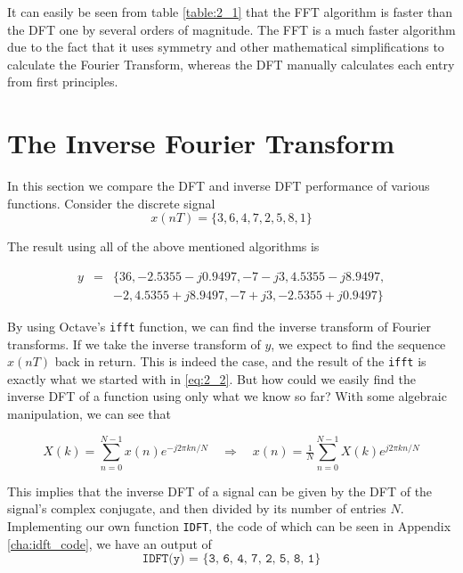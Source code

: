 \documentclass[a4paper, 12pt]{report}
\begin{document}
			It can easily be seen from table \ref{table:2_1} that the FFT algorithm is faster than the DFT one by several orders of magnitude. The FFT is a much faster algorithm due to the fact that it uses symmetry and other mathematical simplifications to calculate the Fourier Transform, whereas the DFT manually calculates each entry from first principles.

		\section{The Inverse Fourier Transform} %
		\label{sec:section_name}
			In this section we compare the DFT and inverse DFT performance of various functions. Consider the discrete signal
			\begin{equation}
				x(nT) = \{3, 6, 4, 7, 2, 5, 8, 1\}
				\label{eq:2_2}
			\end{equation}
			

			The result using all of the above mentioned algorithms is

			\[
				\begin{array}{rcl}
					y & = & \{36, -2.5355 - j0.9497, -7 - j3, 4.5355 - j8.9497, \\
					&  & -2, 4.5355 + j8.9497, -7 + j3, -2.5355 + j0.9497\}
				\end{array}
			\]

			By using Octave's \texttt{ifft} function, we can find the inverse transform of Fourier transforms. If we take the inverse transform of $y$, we expect to find the sequence $x(nT)$ back in return. This is indeed the case, and the result of the \texttt{ifft} is exactly what we started with in \eqref{eq:2_2}. But how could we easily find the inverse DFT of a function using only what we know so far? With some algebraic manipulation, we can see that

			\begin{equation}
				X(k) = \sum^{N-1}_{n=0} x(n) e^{-j 2 \pi k n / N}\quad \Rightarrow \quad x(n) = \tfrac{1}{N} \sum^{N-1}_{n=0} X(k) e^{j 2 \pi k n / N}
			\end{equation}

			This implies that the inverse DFT of a signal can be given by the DFT of the signal's complex conjugate, and then divided by its number of entries $N$. Implementing our own function \texttt{IDFT}, the code of which can be seen in Appendix \ref{cha:idft_code}, we have an output of
			\[
				\texttt{IDFT(y) = \{3, 6, 4, 7, 2, 5, 8, 1\}} 
			\]
\end{document}
